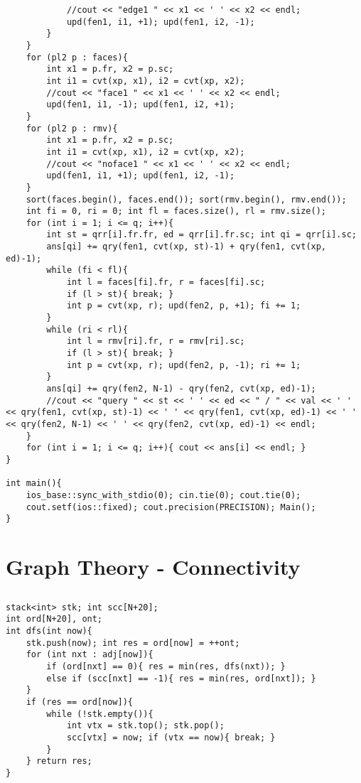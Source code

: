 \documentclass[landscape, 8pt, a4paper, oneside, twocolumn]{extarticle}
\begin{document}
\begin{verbatim}
            //cout << "edge1 " << x1 << ' ' << x2 << endl;
            upd(fen1, i1, +1); upd(fen1, i2, -1);
        }
    }
    for (pl2 p : faces){
        int x1 = p.fr, x2 = p.sc;
        int i1 = cvt(xp, x1), i2 = cvt(xp, x2);
        //cout << "face1 " << x1 << ' ' << x2 << endl;
        upd(fen1, i1, -1); upd(fen1, i2, +1);
    }
    for (pl2 p : rmv){
        int x1 = p.fr, x2 = p.sc;
        int i1 = cvt(xp, x1), i2 = cvt(xp, x2);
        //cout << "noface1 " << x1 << ' ' << x2 << endl;
        upd(fen1, i1, +1); upd(fen1, i2, -1);
    }
    sort(faces.begin(), faces.end()); sort(rmv.begin(), rmv.end());
    int fi = 0, ri = 0; int fl = faces.size(), rl = rmv.size();
    for (int i = 1; i <= q; i++){
        int st = qrr[i].fr.fr, ed = qrr[i].fr.sc; int qi = qrr[i].sc;
        ans[qi] += qry(fen1, cvt(xp, st)-1) + qry(fen1, cvt(xp, ed)-1);
        while (fi < fl){
            int l = faces[fi].fr, r = faces[fi].sc;
            if (l > st){ break; }
            int p = cvt(xp, r); upd(fen2, p, +1); fi += 1;
        }
        while (ri < rl){
            int l = rmv[ri].fr, r = rmv[ri].sc;
            if (l > st){ break; }
            int p = cvt(xp, r); upd(fen2, p, -1); ri += 1;
        }
        ans[qi] += qry(fen2, N-1) - qry(fen2, cvt(xp, ed)-1);
        //cout << "query " << st << ' ' << ed << " / " << val << ' ' << qry(fen1, cvt(xp, st)-1) << ' ' << qry(fen1, cvt(xp, ed)-1) << ' ' << qry(fen2, N-1) << ' ' << qry(fen2, cvt(xp, ed)-1) << endl;
    }
    for (int i = 1; i <= q; i++){ cout << ans[i] << endl; }
}

int main(){
    ios_base::sync_with_stdio(0); cin.tie(0); cout.tie(0);
    cout.setf(ios::fixed); cout.precision(PRECISION); Main();
}
\end{verbatim}
\section{Graph Theory - Connectivity}
\subsection{}
\begin{verbatim}
stack<int> stk; int scc[N+20];
int ord[N+20], ont;
int dfs(int now){
    stk.push(now); int res = ord[now] = ++ont;
    for (int nxt : adj[now]){
        if (ord[nxt] == 0){ res = min(res, dfs(nxt)); }
        else if (scc[nxt] == -1){ res = min(res, ord[nxt]); }
    }
    if (res == ord[now]){
        while (!stk.empty()){
            int vtx = stk.top(); stk.pop();
            scc[vtx] = now; if (vtx == now){ break; }
        }
    } return res;
}
\end{verbatim}
\end{document}
